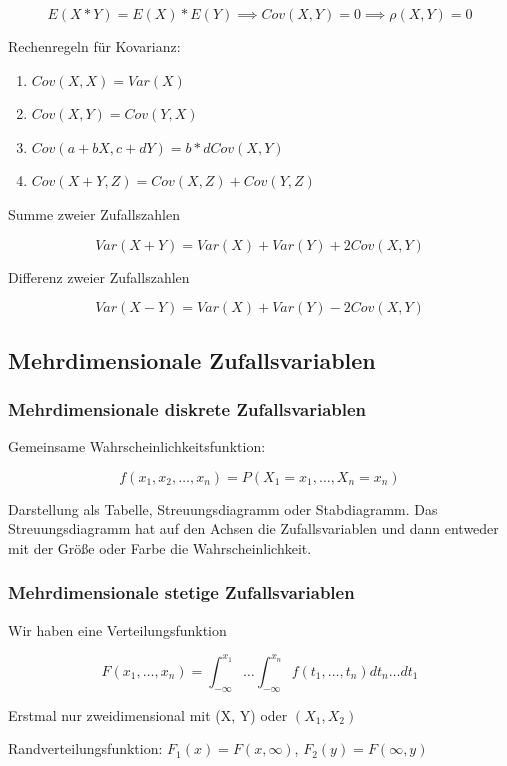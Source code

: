 \documentclass[a4paper]{article}
\begin{document}
\[
E(X*Y) = E(X)*E(Y) \implies Cov(X, Y)=0 \implies \rho(X, Y) = 0
\]

Rechenregeln für Kovarianz:

\begin{enumerate}
    \item $Cov(X, X) = Var(X)$
    \item $Cov(X, Y) = Cov(Y, X)$
    \item $Cov(a+bX, c+dY) = b*d Cov(X, Y)$
    \item $Cov(X+Y, Z) = Cov(X, Z) + Cov(Y, Z)$
\end{enumerate}

Summe zweier Zufallszahlen

\[
Var(X + Y) = Var(X) + Var(Y) + 2 Cov(X, Y)
\]

Differenz zweier Zufallszahlen

\[
Var(X-Y) = Var(X) + Var(Y) - 2 Cov(X, Y)
\]


\subsection{Mehrdimensionale Zufallsvariablen}

\subsubsection{Mehrdimensionale diskrete Zufallsvariablen}

Gemeinsame Wahrscheinlichkeitsfunktion:

\[
f(x_1, x_2, \dots, x_n) = P(X_1=x_1, \dots, X_n=x_n)
\]

Darstellung als Tabelle, Streuungsdiagramm oder Stabdiagramm. Das Streuungsdiagramm hat auf den Achsen die Zufallsvariablen und dann entweder mit der Größe oder Farbe die Wahrscheinlichkeit.

\subsubsection{Mehrdimensionale stetige Zufallsvariablen}

Wir haben eine Verteilungsfunktion

\[
F(x_1, \dots, x_n) = \int_{-\infty}^{x_1} \dots \int_{-\infty}^{x_n} f(t_1, \dots, t_n) dt_n \dots dt_1
\]

Erstmal nur zweidimensional mit (X, Y) oder $(X_1, X_2)$

Randverteilungsfunktion: $F_1(x) = F(x, \infty)$, $F_2(y) = F(\infty, y)$
\end{document}
